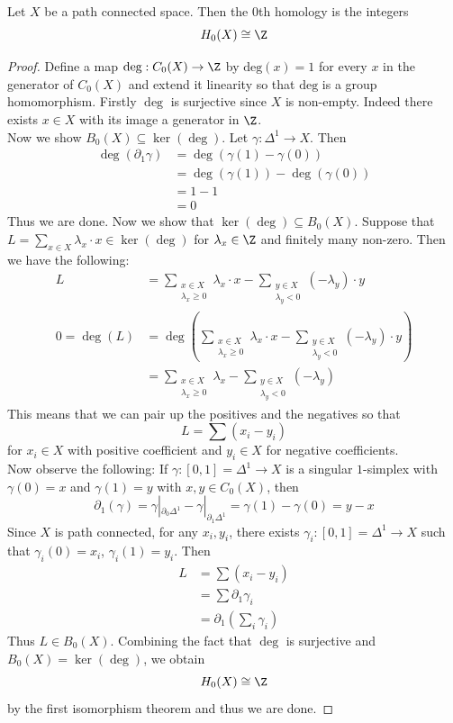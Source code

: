 \documentclass[a4paper]{article}
\begin{document}
\begin{lmm}{}{} Let $X$ be a path connected space. Then the $0$th homology is the integers $$H_0(X)\cong\Z$$ 
\begin{proof}
Define a map $\text{deg}:C_0(X)\to\Z$ by $\text{deg}(x)=1$ for every $x$ in the generator of $C_0(X)$ and extend it linearity so that $\text{deg}$ is a group homomorphism. Firstly $\deg$ is surjective since $X$ is non-empty. Indeed there exists $x\in X$ with its image a generator in $\Z$. \\

Now we show $B_0(X)\subseteq\ker(\deg)$. Let $\gamma:\Delta^1\to X$. Then 
\begin{align*}
\deg(\partial_1\gamma)&=\deg(\gamma(1)-\gamma(0))\\
&=\deg(\gamma(1))-\deg(\gamma(0))\\
&=1-1\\
&=0
\end{align*}
Thus we are done. Now we show that $\ker(\deg)\subseteq B_0(X)$. Suppose that $L=\sum_{x\in X}\lambda_x\cdot x\in\ker(\deg)$ for $\lambda_x\in\Z$ and finitely many non-zero. Then we have the following: 
\begin{align*}
L&=\sum_{\substack{x\in X\\\lambda_x\geq 0}}\lambda_x\cdot x-\sum_{\substack{y\in X\\\lambda_y<0}}(-\lambda_y)\cdot y\\
0=\deg(L)&=\deg\left(\sum_{\substack{x\in X\\\lambda_x\geq 0}}\lambda_x\cdot x-\sum_{\substack{y\in X\\\lambda_y<0}}(-\lambda_y)\cdot y\right)\\
&=\sum_{\substack{x\in X\\\lambda_x\geq 0}}\lambda_x-\sum_{\substack{y\in X\\\lambda_y<0}}(-\lambda_y)
\end{align*}
This means that we can pair up the positives and the negatives so that $$L=\sum(x_i-y_i)$$ for $x_i\in X$ with positive coefficient and $y_i\in X$ for negative coefficients. \\ 

Now observe the following: If $\gamma:[0,1]=\Delta^1\to X$ is a singular $1$-simplex with $\gamma(0)=x$ and $\gamma(1)=y$ with $x,y\in C_0(X)$, then $$\partial_1(\gamma)=\gamma|_{\partial_0\Delta^1}-\gamma|_{\partial_1\Delta^1}=\gamma(1)-\gamma(0)=y-x$$ Since $X$ is path connected, for any $x_i,y_i$, there exists $\gamma_i:[0,1]=\Delta^1\to X$ such that $\gamma_i(0)=x_i$, $\gamma_i(1)=y_i$. Then 
\begin{align*}
L&=\sum(x_i-y_i)\\
&=\sum\partial_1\gamma_i\\
&=\partial_1\left(\sum_i\gamma_i\right)
\end{align*}
Thus $L\in B_0(X)$. Combining the fact that $\deg$ is surjective and $B_0(X)=\ker(\deg)$, we obtain $$H_0(X)\cong\Z$$ by the first isomorphism theorem and thus we are done. 
\end{proof}
\end{lmm}
\end{document}
